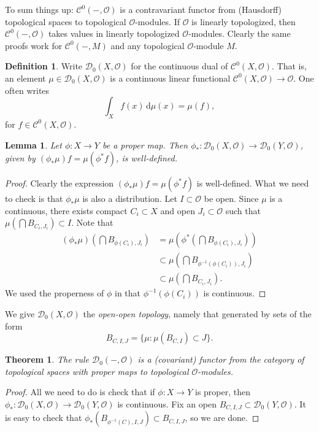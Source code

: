 \documentclass{article}
\newcommand{\cO}{\mathcal{O}}
\newcommand{\dd}{\mathrm{d}}
\newcommand{\sC}{\mathscr{C}}
\newcommand{\sD}{\mathscr{D}}
\newtheorem{lemma}[subsection]{Lemma}
\newtheorem{theorem}[subsection]{Theorem}
\theoremstyle{definition}
\newtheorem{definition}[subsection]{Definition}
\begin{document}
To sum things up: $\sC^0(-,\cO)$ is a contravariant functor from 
(Hausdorff) topological spaces to topological $\cO$-modules. If $\cO$ is 
linearly topologized, then $\sC^0(-,\cO)$ takes values in linearly topologized 
$\cO$-modules. Clearly the same proofs work for $\sC^0(-,M)$ and any 
topological $\cO$-module $M$. 

\begin{definition}
Write $\sD_0(X,\cO)$ for the continuous dual of $\sC^0(X,\cO)$. That is, an 
element $\mu\in \sD_0(X,\cO)$ is a continuous linear functional 
$\sC^0(X,\cO)\to \cO$. One often writes 
\[
  \int_X f(x)\, \dd \mu(x) = \mu(f) ,
\]
for $f\in \sC^0(X,\cO)$. 
\end{definition}

\begin{lemma}
Let $\phi\colon X\to Y$ be a proper map. Then 
$\phi_\ast\colon \sD_0(X,\cO)\to \sD_0(Y,\cO)$, given by 
$(\phi_\ast\mu)f=\mu(\phi^\ast f)$, is well-defined. 
\end{lemma}
\begin{proof}
Clearly the expression $(\phi_\ast \mu)f=\mu(\phi^\ast f)$ is well-defined. 
What we need to check is that $\phi_\ast\mu$ is also a distribution. Let 
$I\subset \cO$ be open. Since $\mu$ is a continuous, there exists compact 
$C_i\subset X$ and open $J_i\subset \cO$ such that 
$\mu(\bigcap B_{C_i,J_i})\subset I$. 
Note that 
\begin{align*}
  (\phi_\ast \mu)\left(\bigcap B_{\phi(C_i),J_i}\right)
    &= \mu\left(\phi^\ast\left(\bigcap B_{\phi(C_i),J_i}\right)\right) \\
    &\subset \mu\left(\bigcap B_{\phi^{-1}(\phi(C_i)),J_i}\right) \\
    &\subset \mu\left(\bigcap B_{C_i,J_i}\right) .
\end{align*}
We used the properness of $\phi$ in that $\phi^{-1}(\phi(C_i))$ is continuous. 
\end{proof}

We give $\sD_0(X,\cO)$ the \emph{open-open topology}, namely that generated by 
sets of the form 
\[
  B_{C,I,J} = \{\mu\colon \mu(B_{C,I})\subset J\} .
\]

\begin{theorem}
The rule $\sD_0(-,\cO)$ is a (covariant) functor from the category of 
topological spaces with proper maps to topological $\cO$-modules. 
\end{theorem}
\begin{proof}
All we need to do is check that if $\phi\colon X\to Y$ is proper, then 
$\phi_\ast\colon \sD_0(X,\cO)\to \sD_0(Y,\cO)$ is continuous. Fix an open 
$B_{C,I,J}\subset \sD_0(Y,\cO)$. It is easy to check that 
$\phi_\ast(B_{\phi^{-1}(C),I,J})\subset B_{C,I,J}$, so we are done. 
\end{proof}
\end{document}
